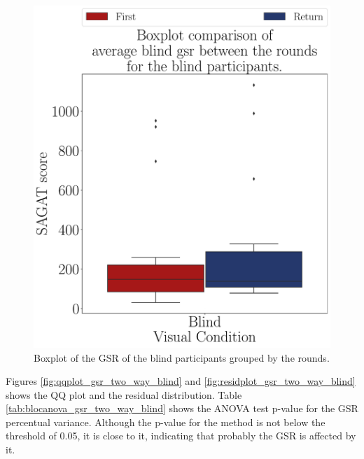 \begin{figure}[!htb]
\begin{minipage}{0.45\textwidth}
        \centering
        \includegraphics[width = \textwidth]{Resultados/GSR/Figuras/pdf/boxplot_gsr_avg_blind_rounds.pdf}
        \caption{Boxplot of the GSR of the blind participants grouped by the rounds.}
        \label{fig:boxplot_gsr_avg_blind_rounds}
    \end{minipage}
\end{figure}

Figures \ref{fig:qqplot_gsr_two_way_blind} and \ref{fig:residplot_gsr_two_way_blind} shows the QQ plot and the residual distribution. Table \ref{tab:blocanova_gsr_two_way_blind} shows the ANOVA test p-value for the GSR percentual variance. Although the p-value for the method is not below the threshold of 0.05, it is close to it, indicating that probably the GSR is affected by it. 

